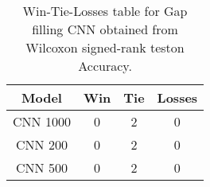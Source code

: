 \begin{table}[H]
\centering
\begin{tabular}{|c|c|c|c|}

\textbf{Model} &  \textbf{Win} &  \textbf{Tie} &  \textbf{Losses} \\
\hline

      CNN 1000 &             0 &             2 &                0 \\
\hline
       CNN 200 &             0 &             2 &                0 \\
\hline
       CNN 500 &             0 &             2 &                0 \\
\hline

\end{tabular}
\caption{Win-Tie-Losses table for Gap filling CNN obtained from Wilcoxon signed-rank teston Accuracy.}
\label{tab:gap_filling_cnn_model_comparison}
\end{table}